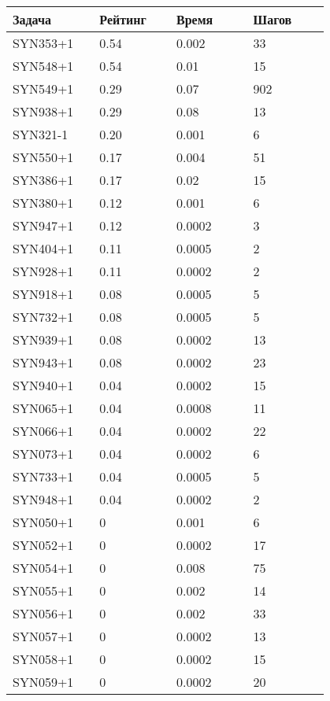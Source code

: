 \begin{longtable}[H]{|p{0.2\linewidth}|p{0.2\linewidth}|p{0.2\linewidth}|p{0.2\linewidth}|}
\hline
\textbf{Задача} & \textbf{Рейтинг} & \textbf{Время} & \textbf{Шагов} \\
\hline
SYN353+1 &  0.54 &  0.002 &  33 \\
\hline
SYN548+1 &  0.54 &  0.01 &  15 \\
\hline
SYN549+1 &  0.29 &  0.07 &  902 \\
\hline
SYN938+1 &  0.29 &  0.08 &  13 \\
\hline
SYN321-1 &  0.20 &  0.001 &  6 \\
\hline
SYN550+1 &  0.17 &  0.004 &  51 \\
\hline
SYN386+1 &  0.17 &  0.02 &  15 \\
\hline
SYN380+1 &  0.12 &  0.001 &  6 \\
\hline
SYN947+1 &  0.12 &  0.0002 &  3 \\
\hline
SYN404+1 &  0.11 &  0.0005 &  2 \\
\hline
SYN928+1 &  0.11 &  0.0002 &  2 \\
\hline
SYN918+1 &  0.08 &  0.0005 &  5 \\
\hline
SYN732+1 &  0.08 &  0.0005 &  5 \\
\hline
SYN939+1 &  0.08 &  0.0002 &  13 \\
\hline
SYN943+1 &  0.08 &  0.0002 &  23 \\
\hline
SYN940+1 &  0.04 &  0.0002 &  15 \\
\hline
SYN065+1 &  0.04 &  0.0008 &  11 \\
\hline
SYN066+1 &  0.04 &  0.0002 &  22 \\
\hline
SYN073+1 &  0.04 &  0.0002 &  6 \\
\hline
SYN733+1 &  0.04 &  0.0005 &  5 \\
\hline
SYN948+1 &  0.04 &  0.0002 &  2 \\
\hline
SYN050+1 &  0 &  0.001 &  6 \\
\hline
SYN052+1 &  0 &  0.0002 &  17 \\
\hline
SYN054+1 &  0 &  0.008 &  75 \\
\hline
SYN055+1 &  0 &  0.002 &  14 \\
\hline
SYN056+1 &  0 &  0.002 &  33 \\
\hline
SYN057+1 &  0 &  0.0002 &  13 \\
\hline
SYN058+1 &  0 &  0.0002 &  15 \\
\hline
SYN059+1 &  0 &  0.0002 &  20 \\

\end{longtable}

